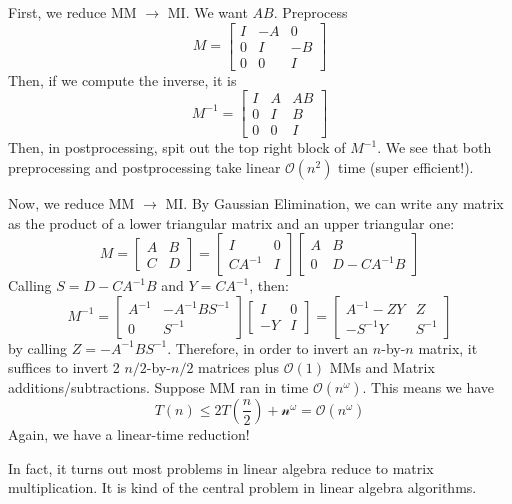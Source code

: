 \begin{algothm}
    First, we reduce MM $\to$ MI.
    We want $AB$. Preprocess \[M = \begin{bmatrix}
        I & -A & 0 \\
        0 & I & -B \\
        0 & 0 & I
    \end{bmatrix} \]
    Then, if we compute the inverse, it is
    \[ M^{-1} = \begin{bmatrix}
        I & A & AB \\
        0 & I & B \\
        0 & 0 & I
    \end{bmatrix}\]
    Then, in postprocessing, spit out the top right block of $M^{-1}$. We see that both preprocessing and postprocessing take linear $\mathcal{O}(n^2)$ time
    (super efficient!).

    Now, we reduce MM $\to$ MI. By Gaussian Elimination, we can write any matrix as the product of a lower triangular matrix and an upper triangular one:
    \[ M = \begin{bmatrix}
        A & B \\ C & D
    \end{bmatrix} = \begin{bmatrix}
        I & 0 \\ CA^{-1} & I
    \end{bmatrix} \begin{bmatrix}
        A & B \\ 0 & D-CA^{-1}B
    \end{bmatrix}\]
    Calling $S = D - CA^{-1}B$ and $Y = CA^{-1}$, then:
    \[M^{-1} = \begin{bmatrix}
        A^{-1} & -A^{-1} B S^{-1} \\ 0 & S^{-1}
    \end{bmatrix} \begin{bmatrix}
        I & 0 \\ -Y & I
    \end{bmatrix} = \begin{bmatrix}
        A^{-1} - ZY & Z \\ -S^{-1}Y & S^{-1}
    \end{bmatrix}\]
    by calling $Z = -A^{-1}BS^{-1}$. Therefore, in order to invert an $n$-by-$n$ matrix, it suffices to invert 2 $n/2$-by-$n/2$ matrices
    plus $\mathcal{O}(1)$ MMs and Matrix additions/subtractions. Suppose MM ran in time $\mathcal{O}(n^\omega)$. This means we have 
    \[ T(n) \leq 2 T(\frac{n}{2}) + \mathcal{n^{\omega}} = \mathcal{O}(n^\omega) \]
    Again, we have a linear-time reduction!
\end{algothm}

In fact, it turns out most problems in linear algebra reduce to matrix multiplication. It is kind of the central problem in
linear algebra algorithms.